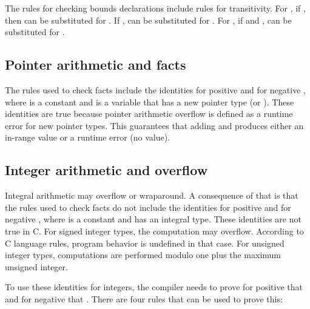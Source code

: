 The rules for checking bounds declarations include rules for
transitivity. For , if
 \code{<=} , then  can
be substituted for . 
If  \code{<=} ,  can be substituted for
.  For , if
 \code{<=}  and  ,
 can be substituted for .

\subsection{Pointer arithmetic and facts}

The rules used to check facts include the identities  \code{<}  \code{+} 
for positive  and  \code{+}  \code{<}  for
negative , where  is a
constant and  is a variable that has a new pointer type (\ptr or \arrayptr).
These identities are true
because pointer arithmetic overflow is defined as a runtime error for
new pointer types. This guarantees that adding  and  produces either
an in-range value or a runtime error (no value).

\subsection{Integer arithmetic and overflow}
\label{section:where-clauses-and-overflow}

Integral arithmetic may overflow or wraparound. A consequence of that is
that the rules used to check facts do not include the identities 
 \code{<}  \code{+}  
for positive  and  \code{+}  \code{<}  for 
negative , where  is a
constant and  has an integral type. These identities are not true in C.  For signed integer types, the computation  \code{+} 
may overflow.   According to C language
rules, program behavior is undefined in that case.  For unsigned
integer types, computations are performed modulo one plus
the maximum unsigned integer.

To use these identities for integers, the compiler needs to prove for
positive  that  \code{+}   and for negative  that
  \code{+} .  There are four rules that can be used to prove this:

